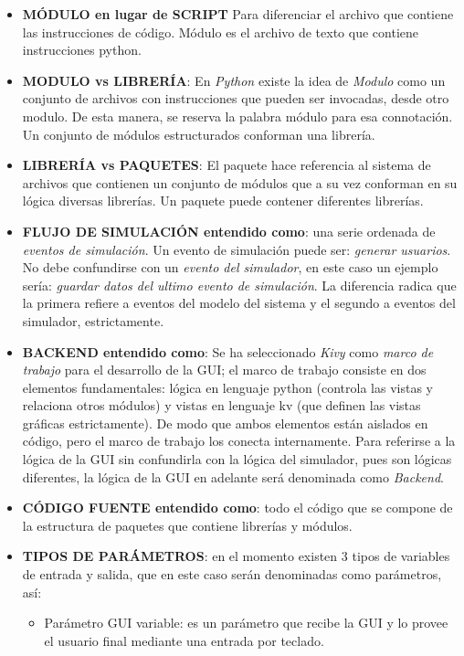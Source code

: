 \begin{itemize}
    
    \item \textbf{MÓDULO en lugar de SCRIPT} Para diferenciar el archivo que contiene las instrucciones de código. %
    Módulo es el archivo de texto que contiene instrucciones python.
    
    \item \textbf{MODULO vs LIBRERÍA}: En \textit{Python} existe la idea de \textit{Modulo} como un conjunto de archivos con instrucciones que pueden ser invocadas, desde otro modulo. De esta manera, se reserva la palabra módulo para esa connotación. Un conjunto de módulos estructurados conforman una librería.
    
    \item \textbf{LIBRERÍA vs PAQUETES}:
    El paquete hace referencia al sistema de archivos que contienen un conjunto de módulos que a su vez conforman en su lógica diversas librerías. Un paquete puede contener diferentes librerías.
    
    \item \textbf{FLUJO DE SIMULACIÓN entendido como}: una serie ordenada de \textit{eventos de simulación}. Un evento de simulación puede ser: \textit{generar usuarios}. No debe confundirse con un \textit{evento del simulador}, en este caso un ejemplo sería:  \textit{guardar datos del ultimo evento de simulación}. La diferencia radica que la primera refiere a eventos del modelo del sistema y el segundo a eventos del simulador, estrictamente.
    
    \item \textbf{BACKEND entendido como}: Se ha seleccionado \textit{Kivy} como \textit{marco de trabajo} para el desarrollo de la GUI; el marco de trabajo consiste en dos elementos fundamentales: lógica en lenguaje python (controla las vistas y relaciona otros módulos) y vistas en lenguaje kv (que definen las vistas gráficas estrictamente). De modo que ambos elementos están aislados en código, pero el marco de trabajo los conecta internamente. Para referirse a la lógica de la GUI sin confundirla con la lógica del simulador, pues son lógicas diferentes, la lógica de la GUI en adelante será denominada como
    \textit{Backend}.
    
    \item \textbf{CÓDIGO FUENTE entendido como}: todo el código que se compone de la estructura de paquetes que contiene librerías y módulos.
    
    \item \textbf{TIPOS DE PARÁMETROS}: en el momento existen 3 tipos de variables de entrada y salida, que en este caso serán denominadas como parámetros, así: %
    \begin{itemize}
        \item Parámetro GUI variable: es un parámetro que recibe la GUI y lo provee el usuario final mediante una entrada por teclado.
         

\end{itemize}
\end{itemize}
